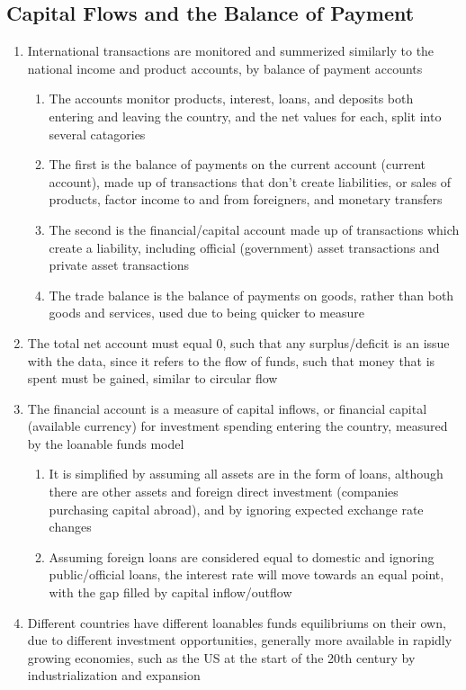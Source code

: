 \documentclass[11 pt, twoside]{article}
\begin{document}
\subsection{Capital Flows and the Balance of Payment}
\begin{enumerate}
\item International transactions are monitored and summerized similarly to the national income and product accounts, by balance of payment accounts
\begin{enumerate}
\item The accounts monitor products, interest, loans, and deposits both entering and leaving the country, and the net values for each, split into several catagories
\item The first is the balance of payments on the current account (current account), made up of transactions that don't create liabilities, or sales of products, factor income to and from foreigners, and monetary transfers
\item The second is the financial/capital account made up of transactions which create a liability, including official (government) asset transactions and private asset transactions
\item The trade balance is the balance of payments on goods, rather than both goods and services, used due to being quicker to measure
\end{enumerate}
\item The total net account must equal 0, such that any surplus/deficit is an issue with the data, since it refers to the flow of funds, such that money that is spent must be gained, similar to circular flow
\item The financial account is a measure of capital inflows, or financial capital (available currency) for investment spending entering the country, measured by the loanable funds model
\begin{enumerate}
\item It is simplified by assuming all assets are in the form of loans, although there are other assets and foreign direct investment (companies purchasing capital abroad), and by ignoring expected exchange rate changes
\item Assuming foreign loans are considered equal to domestic and ignoring public/official loans, the interest rate will move towards an equal point, with the gap filled by capital inflow/outflow
\end{enumerate}
\item Different countries have different loanables funds equilibriums on their own, due to different investment opportunities, generally more available in rapidly growing economies, such as the US at the start of the 20th century by industrialization and expansion

\end{enumerate}
\end{document}
